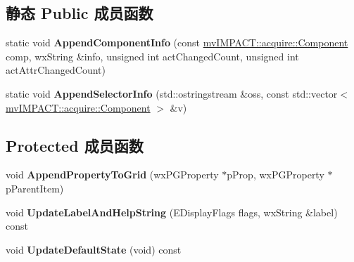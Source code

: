 \subsection*{静态 Public 成员函数}
\begin{DoxyCompactItemize}
\item 
\hypertarget{class_prop_data_ab7d4ddd91582b5d0c4345015f81b296d}{static void {\bfseries Append\+Component\+Info} (const \hyperlink{classmv_i_m_p_a_c_t_1_1acquire_1_1_component}{mv\+I\+M\+P\+A\+C\+T\+::acquire\+::\+Component} comp, wx\+String \&info, unsigned int act\+Changed\+Count, unsigned int act\+Attr\+Changed\+Count)}\label{class_prop_data_ab7d4ddd91582b5d0c4345015f81b296d}

\item 
\hypertarget{class_prop_data_a60ca83806380bb7f54750e9580198989}{static void {\bfseries Append\+Selector\+Info} (std\+::ostringstream \&oss, const std\+::vector$<$ \hyperlink{classmv_i_m_p_a_c_t_1_1acquire_1_1_component}{mv\+I\+M\+P\+A\+C\+T\+::acquire\+::\+Component} $>$ \&v)}\label{class_prop_data_a60ca83806380bb7f54750e9580198989}

\end{DoxyCompactItemize}
\subsection*{Protected 成员函数}
\begin{DoxyCompactItemize}
\item 
\hypertarget{class_prop_data_a2f650bdd2bdfdc1bf1f1a14a91a5ae53}{void {\bfseries Append\+Property\+To\+Grid} (wx\+P\+G\+Property $\ast$p\+Prop, wx\+P\+G\+Property $\ast$p\+Parent\+Item)}\label{class_prop_data_a2f650bdd2bdfdc1bf1f1a14a91a5ae53}

\item 
\hypertarget{class_prop_data_a7d6b31612315ad6f7a510c01f7b09f68}{void {\bfseries Update\+Label\+And\+Help\+String} (E\+Display\+Flags flags, wx\+String \&label) const }\label{class_prop_data_a7d6b31612315ad6f7a510c01f7b09f68}

\item 
\hypertarget{class_prop_data_ab652bc9b7a6e29c850e50c72c1ee2fa4}{void {\bfseries Update\+Default\+State} (void) const }\label{class_prop_data_ab652bc9b7a6e29c850e50c72c1ee2fa4}

\end{DoxyCompactItemize}
